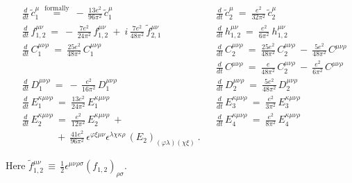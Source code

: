 \documentclass[12pt]{revtex4}
\newcommand{\wt}{\widetilde}
\begin{document}
\begin{align*}
	&
	\frac{d} {d t}\, \wt{c}_1^\mu ~\overset{\text{formally}}{=}~
		-\, \frac{13e^2}{96\pi^2}\, \wt{c}_1^\mu
	&&
	\frac{d} {d t}\, \wt{c}_2^\mu ~=~
		\frac{e^2}{32\pi^2}\, \wt{c}_2^\mu
	\\
	&
	\frac{d} {d t}\, f_{1,2}^{\mu\nu} ~=~
		-\, \frac{7e^2}{24\pi^2}\, f_{1,2}^{\mu\nu}
		~+~
		i\, \frac{7e^2}{48\pi^2}\, \wt{f}{}_{2,1}^{\mu\nu}
	&&
	\frac{d} {d t}\, h_{1,2}^{\mu\nu} ~=~
		\frac{e^2}{6\pi^2}\ h_{1,2}^{\mu\nu} 
	\\
	&
	\frac{d} {d t}\, C_1^{\mu\nu\rho} ~=~
		\frac{25e^2}{48\pi^2}\, C_1^{\mu\nu\rho}
	&&
	\frac{d} {d t}\, C_2^{\mu\nu\rho} ~=~
		\frac{25e^2}{48\pi^2}\, C_2^{\mu\nu\rho}
		~-~
		\frac{5e^2}{48\pi^2}\, C^{\mu\nu\rho}
	\\
	&&&
	\frac{d} {d t}\, C^{\mu\nu\rho} ~=~
		\frac{e}{48\pi^2}\, C_2^{\mu\nu\rho} 
		~-~
		\frac{e^2}{6\pi^2}\, C^{\mu\nu\rho}
	\\
	&
	\frac{d} {d t}\, D_1^{\mu\nu\rho} ~=~
		-\, \frac{e^2}{16\pi^2}\, D_1^{\mu\nu\rho}
	&&
	\frac{d} {d t}\, D_2^{\mu\nu\rho} ~=~
		\frac{5e^2}{48\pi^2}\, D_2^{\mu\nu\rho}
	\\
	&
	\frac{d} {d t}\, E_1^{\kappa\mu\nu\rho} ~=~
		\frac{13e^2}{24\pi^2}\, E_1^{\kappa\mu\nu\rho}
	&&
	\frac{d} {d t}\, E_3^{\kappa\mu\nu\rho} ~=~
		\frac{e^2}{3\pi^2}\, E_3^{\kappa\mu\nu\rho}
	\\
	&
	\frac{d} {d t}\, E_2^{\kappa\mu\nu\rho} ~=~
		\frac{e^2}{12\pi^2}\, E_2^{\kappa\mu\nu\rho}
		~+~      
	&&
	\frac{d} {d t}\, E_4^{\kappa\mu\nu\rho} ~=~
		\frac{e^2}{8\pi^2}\, E_4^{\kappa\mu\nu\rho}
	\\
	&
	\phantom{\frac{d} {d t}\, E_2^{\kappa\mu\nu\rho}}
		~+~ \frac{41e^2}{96\pi^2}\,
		\epsilon^{\varphi\xi\mu\nu} 
		\epsilon^{\lambda\chi\kappa\rho}\,
		(E_2)_{(\varphi\lambda)(\chi\xi)}
	~.
\end{align*}	

	Here $ \wt{f}{}_{1,2}^{\mu\nu} \,\equiv\, \frac{1}{2} 
		\epsilon^{\mu\nu\rho\sigma} (f_{1,2})_{\rho\sigma} $.
\end{document}
